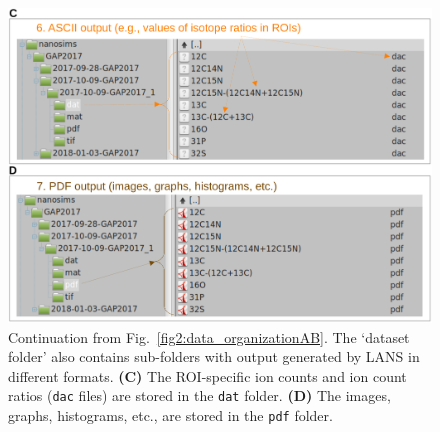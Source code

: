 \documentclass[a4paper, 11pt]{article}
\newcommand{\ttt}[1]{\texttt{#1}}
\begin{document}
\begin{figure}[ht]
\centering
\includegraphics[width=\textwidth]{figs2/folders_organizationCD}
\caption{\label{fig2:data_organizationCD}%
  Continuation from Fig.~\ref{fig2:data_organizationAB}. %
The `dataset folder' also contains sub-folders with output generated by LANS in different formats. %
    \textbf{(C)} The ROI-specific ion counts and ion count ratios (\ttt{dac} files) are stored in the \ttt{dat} folder. %
    \textbf{(D)} The images, graphs, histograms, etc., are stored in the \ttt{pdf} folder.}
\end{figure}

\end{document}
